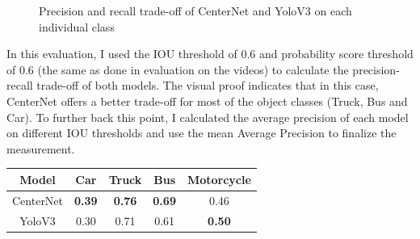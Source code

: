 \documentclass[12pt]{article}
\begin{document}
\begin{figure}[H]%
    \centering
    \qquad
    \caption{Precision and recall trade-off of CenterNet and YoloV3 on each individual class}%
    \label{fig:example}%
\end{figure}

In this evaluation, I used the IOU threshold of 0.6 and probability score threshold of 0.6 (the same as done in evaluation on the videos) to calculate the precision-recall trade-off of both models. The visual proof indicates that in this case, CenterNet offers a better trade-off for most of the object classes (Truck, Bus and Car). To further back this point, I calculated the average precision of each model on different IOU thresholds and use the mean Average Precision to finalize the measurement.\newline

\begin{center}
\begin{tabular}{ |c|c|c|c|c| } 
\hline
Model & Car & Truck & Bus & Motorcycle \\
\hline
CenterNet & \textbf{0.39} & \textbf{0.76} & \textbf{0.69} & 0.46 \\ 
YoloV3 & 0.30 & 0.71 & 0.61 & \textbf{0.50} \\ 
\hline
\end{tabular}
\end{center}
\end{document}

